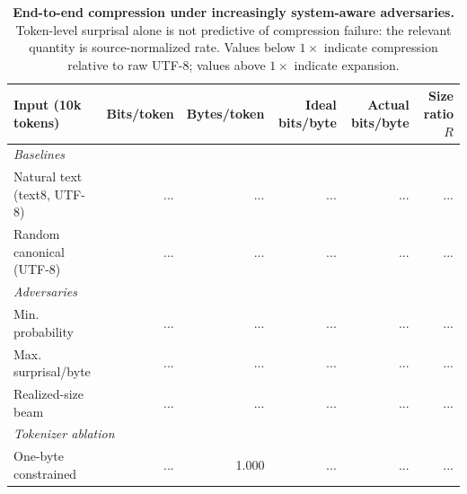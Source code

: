 \begin{table}[t]
\centering
\caption{
\textbf{End-to-end compression under increasingly system-aware adversaries.}
Token-level surprisal alone is not predictive of compression failure:
the relevant quantity is source-normalized rate.
Values below $1\times$ indicate compression relative to raw UTF-8;
values above $1\times$ indicate expansion.
}
\label{tab:decisive}
\small
\begin{tabular}{lrrrrr}
\toprule
Input (10k tokens) &
Bits/token &
Bytes/token &
Ideal bits/byte &
Actual bits/byte &
Size ratio $R$ \\
\midrule
\multicolumn{6}{l}{\textit{Baselines}}\\
Natural text (text8, UTF-8)      & ... & ... & ... & ... & ... \\
Random canonical (UTF-8)  & ... & ... & ... & ... & ... \\
\midrule
\multicolumn{6}{l}{\textit{Adversaries}}\\
Min. probability    & ... & ... & ... & ... & ... \\
Max. surprisal/byte & ... & ... & ... & ... & ... \\
Realized-size beam & ... & ... & ... & ... & ... \\
\midrule
\multicolumn{6}{l}{\textit{Tokenizer ablation}}\\
One-byte constrained & ... & 1.000 & ... & ... & ... \\
\bottomrule
\end{tabular}
\end{table}